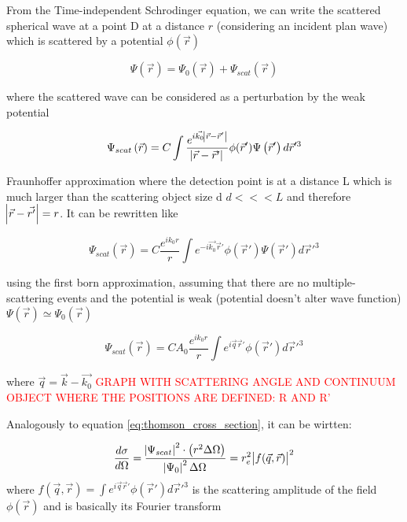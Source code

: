From the Time-independent Schrodinger equation, we can write the scattered spherical wave at a point D at a distance $r$ (considering an incident plan wave) which is scattered by a potential $\phi(\vec{r})$

\begin{equation}
       \Psi\left( \vec{r} \right)= \Psi_0\left( \vec{r} \right) +  \Psi_{scat}\left( \vec{r} \right)
\end{equation}

where the scattered wave can be considered as a perturbation by the weak potential

\begin{equation}
       \Psi_{scat}\left( \vec{r} \right)=C \int \frac{e^{ i \vec{k_0}\abs{\vec{r}-\vec{r}'} } } {\abs{\vec{r}-\vec{r}'}} \phi(\vec{r}')   \Psi\left( \vec{r}' \right) d\vec{r}'^3
\end{equation}

Fraunhoffer approximation where the detection point is at a distance L which is much larger than the scattering object size d $d<<<L$ and therefore $\abs{\vec{r}-\vec{r'}}=r$. It can be rewritten like

\begin{equation}
       \Psi_{scat}\left( \vec{r} \right)=C \frac{e^{i k_0 r}}{r} \int e^{ -i \vec{k_0}\vec{r}' }  \phi(\vec{r}')   \Psi\left( \vec{r}' \right) d\vec{r}'^3
\end{equation}

using the first born approximation, assuming that there are no multiple-scattering events and the potential is weak (potential doesn't alter wave function)  $ \Psi\left( \vec{r} \right) \simeq \Psi_0\left( \vec{r} \right)$

\begin{equation}
       \Psi_{scat}\left( \vec{r} \right)=C A_0 \frac{e^{i k_0 r}}{r} \int e^{ i \vec{q}\vec{r}' }  \phi(\vec{r}')  d\vec{r}'^3
\end{equation}

where $\vec{q}=\vec{k} - \vec{k_0}$ \textcolor{red}{GRAPH WITH SCATTERING ANGLE AND CONTINUUM OBJECT WHERE THE POSITIONS ARE DEFINED: R AND R'}

Analogously to equation \ref{eq:thomson_cross_section}, it can be wirtten:

\begin{equation}
        \label{eq:rayleigh_cross_section}
        \frac{d\sigma}{d\Omega}= \frac{\abs{\Psi_{scat}}^2 \cdot \left(r^2 \Delta \Omega \right)}{\abs{\Psi_{0}}^2\Delta \Omega}=r_e^2 \abs{f(\vec{q},\vec{r})}^2
\end{equation}
where $f(\vec{q},\vec{r})=\int e^{ i \vec{q}\vec{r}' }  \phi(\vec{r}')  d\vec{r}'^3$ is the scattering amplitude of the field $\phi(\vec{r})$ and is basically its Fourier transform

